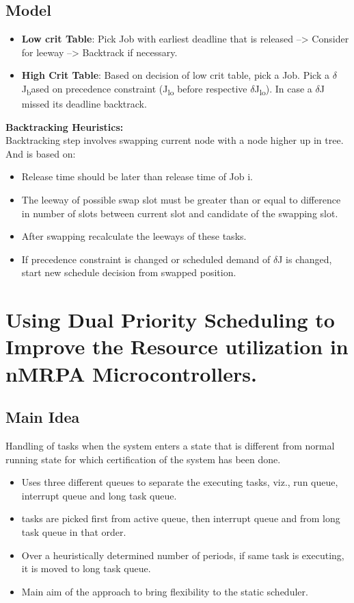\subsection*{Model}
\begin{itemize}
	\item \textbf{Low crit Table}: Pick Job with earliest deadline that is released --> Consider for leeway --> Backtrack if necessary.
	\item \textbf{High Crit Table}: Based on decision of low crit table, pick a Job. Pick a $\delta$J\textsubscript based on precedence constraint (J\textsubscript{lo} before respective $\delta$J\textsubscript{lo}). In case a $\delta$J missed its deadline backtrack.
\end{itemize}
\textbf{Backtracking Heuristics:}\\
Backtracking step involves swapping current node with a node higher up in tree. And is based on:
\begin{itemize}
	\item Release time should be later than release time of Job i.
	\item The leeway of possible swap slot must be greater than or equal to difference in number of slots between current slot and candidate of the swapping slot.
	\item After swapping recalculate the leeways of these tasks.
	\item If precedence constraint is changed or scheduled demand of $\delta$J is changed, start new schedule decision from swapped position.
\end{itemize}


\section{Using Dual Priority Scheduling to Improve the Resource utilization in nMRPA Microcontrollers.}
\subsection*{Main Idea}
Handling of tasks when the system enters a state that is different from normal running state for which certification of the system has been done.
\begin{itemize}
	\item Uses three different queues to separate the executing tasks, viz., run queue, interrupt queue and long task queue.
	\item tasks are picked first from active queue, then interrupt queue and from long task queue in that order.
	\item Over a heuristically determined number of periods, if same task is executing, it is moved to long task queue.
	\item Main aim of the approach to bring flexibility to the static scheduler.
\end{itemize}


